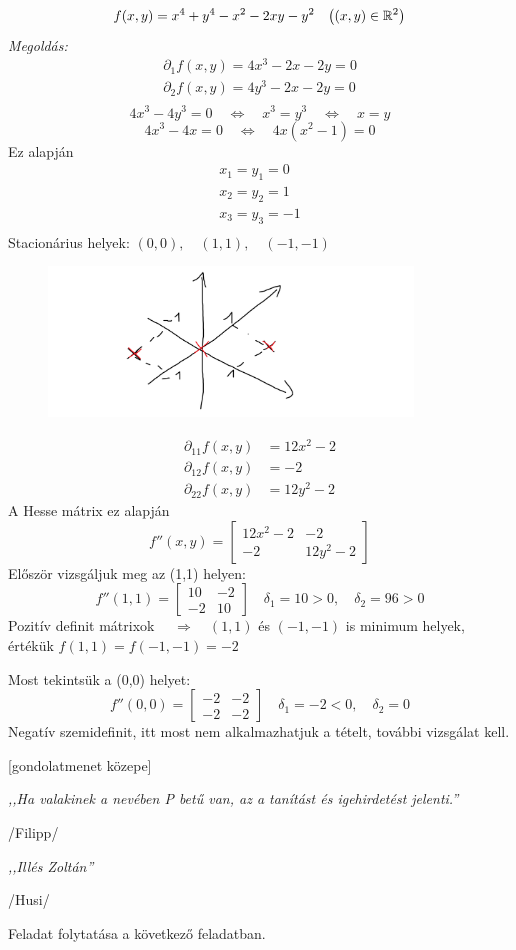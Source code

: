 \documentclass[a4paper,11.5pt]{article}
\begin{document}
	\begin{task}
		\[ f(x,y)=x^4+y^4-x^2-2xy-y^2\quad \big((x,y)\in\mathbb{R}^2\big) \]
		\textit{Megoldás:}
		\begin{align*}
			\partial_1f(x,y)=4x^3-2x-2y=0\\
			\partial_2f(x,y)=4y^3-2x-2y=0\\
		\end{align*}
		\[ 4x^3-4y^3=0\quad \Leftrightarrow\quad x^3=y^3\quad \Leftrightarrow\quad x=y \]
		\[ 4x^3-4x=0\quad \Leftrightarrow\quad 4x(x^2-1)=0 \]
		Ez alapján
		\begin{align*}
			x_1=y_1=0\\
			x_2=y_2=1\\
			x_3=y_3=-1\\
		\end{align*}
		Stacionárius helyek: $(0,0),\quad (1,1),\quad (-1,-1)$
		\begin{figure}[H]
			\centering
			\includegraphics[height=4cm]{../2zh/kepek/40.png}
			\caption{}
		\end{figure}
		\vspace{-9mm}
		\begin{align*}
			\partial_{11}f(x,y)&=12x^2-2\\
			\partial_{12}f(x,y)&=-2\\	
			\partial_{22}f(x,y)&=12y^2-2
		\end{align*}
		A Hesse mátrix ez alapján
		\[ f''(x,y)=\begin{bmatrix}
			12x^2-2&-2\\
			-2&12y^2-2
		\end{bmatrix} \]
		Először vizsgáljuk meg az (1,1) helyen:
		\[ f''(1,1)=\begin{bmatrix}
			10&-2\\
			-2&10
		\end{bmatrix}\quad \delta_1=10>0,\quad \delta_2=96>0 \] 
		Pozitív definit mátrixok $\quad \Rightarrow\quad (1,1)$ és $(-1,-1)$ is minimum helyek, értékük $f(1,1)=f(-1,-1)=-2$
		
		Most tekintsük a (0,0) helyet:
		\[ f''(0,0)=\begin{bmatrix}
			-2&-2\\
			-2&-2
		\end{bmatrix}\quad \delta_1=-2<0,\quad \delta_2=0 \]
		Negatív szemidefinit, itt most nem alkalmazhatjuk a tételt, további vizsgálat kell.
		\begin{center}
			[gondolatmenet közepe]
			\smallskip
			
			\textit{,,Ha valakinek a nevében P betű van, az a tanítást és igehirdetést jelenti.''}
			
			/Filipp/
			\medskip
			
			\textit{,,Illés Zoltán''}
			
			/Husi/
		\end{center}
		Feladat folytatása a következő feladatban.
	\end{task}
\end{document}
